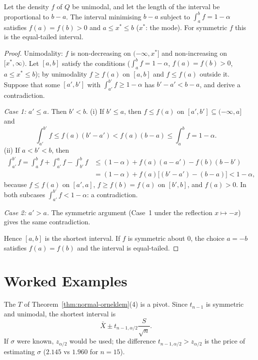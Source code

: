\documentclass[main.tex]{subfiles}
\begin{document}
\begin{theorem}\label{thm:en-kisa}
Let the density $f$ of $Q$ be unimodal, and let the length of the interval be proportional to $b-a$. The interval minimising $b-a$ subject to $\int_a^bf=1-\alpha$ satisfies $f(a)=f(b)>0$ and $a\le x^*\le b$ ($x^*$: the mode). For symmetric $f$ this is the equal-tailed interval.
\end{theorem}
\begin{proof}
Unimodality: $f$ is non-decreasing on $(-\infty,x^*]$ and non-increasing on $[x^*,\infty)$. Let $[a,b]$ satisfy the conditions ($\int_a^bf=1-\alpha$, $f(a)=f(b)>0$, $a\le x^*\le b$); by unimodality $f\ge f(a)$ on $[a,b]$ and $f\le f(a)$ outside it. Suppose that some $[a',b']$ with $\int_{a'}^{b'}f\ge1-\alpha$ has $b'-a'<b-a$, and derive a contradiction.

\emph{Case 1: $a'\le a$.} Then $b'<b$.
(i) If $b'\le a$, then $f\le f(a)$ on $[a',b']\subseteq(-\infty,a]$ and
\[
\int_{a'}^{b'}f\le f(a)(b'-a')<f(a)(b-a)\le\int_a^bf=1-\alpha .
\]
(ii) If $a<b'<b$, then
\begin{align*}
\int_{a'}^{b'}f=\int_a^bf+\int_{a'}^{a}f-\int_{b'}^{b}f&\le(1-\alpha)+f(a)(a-a')-f(b)(b-b')\\
&=(1-\alpha)+f(a)\big[(b'-a')-(b-a)\big]<1-\alpha,
\end{align*}
because $f\le f(a)$ on $[a',a]$, $f\ge f(b)=f(a)$ on $[b',b]$, and $f(a)>0$.
In both subcases $\int_{a'}^{b'}f<1-\alpha$: a contradiction.

\emph{Case 2: $a'>a$.} The symmetric argument (Case~1 under the reflection $x\mapsto-x$) gives the same contradiction.

Hence $[a,b]$ is the shortest interval. If $f$ is symmetric about $0$, the choice $a=-b$ satisfies $f(a)=f(b)$ and the interval is equal-tailed.
\end{proof}

\section{Worked Examples}

\begin{example}
The $T$ of Theorem~\ref{thm:normal-orneklem}(4) is a pivot. Since $t_{n-1}$ is symmetric and unimodal, the shortest interval is
\[
\bar X\pm t_{n-1,\alpha/2}\frac{S}{\sqrt n} .
\]
If $\sigma$ were known, $z_{\alpha/2}$ would be used; the difference $t_{n-1,\alpha/2}>z_{\alpha/2}$ is the price of estimating $\sigma$ ($2.145$ vs $1.960$ for $n=15$).
\end{example}
\end{document}
